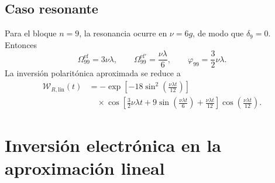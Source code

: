 \documentclass[11pt]{article}
\begin{document}
\subsection{Caso resonante}

Para el bloque $n=9$, la resonancia ocurre en $\nu=6g$, de modo que
$\delta_9=0$. Entonces
\begin{equation}
  \Omega_{99}^{\mathrm{ef}}=3\nu\lambda,
  \qquad
  \Omega_{99}^{\mathrm{ef}\prime}
  =
  \frac{\nu\lambda}{6},
  \qquad
  \varphi_{99}
  =
  \frac32\nu\lambda.
\end{equation}
La inversi\'on polarit\'onica aproximada se reduce a
\begin{equation}
  \boxed{
  \begin{aligned}
  \mathcal W_{R,\mathrm{lin}}(t)
  &=
  -\exp\left[
  -18\sin^2\left(\frac{\nu\lambda t}{12}\right)
  \right]
  \\
  &\quad\times
  \cos\left[
  \frac32\nu\lambda t
  +9\sin\left(\frac{\nu\lambda t}{6}\right)
  +\frac{\nu\lambda t}{12}
  \right]
  \cos\left(\frac{\nu\lambda t}{12}\right).
  \end{aligned}
  }
\end{equation}

\section{Inversi\'on electr\'onica en la aproximaci\'on lineal}
\end{document}
